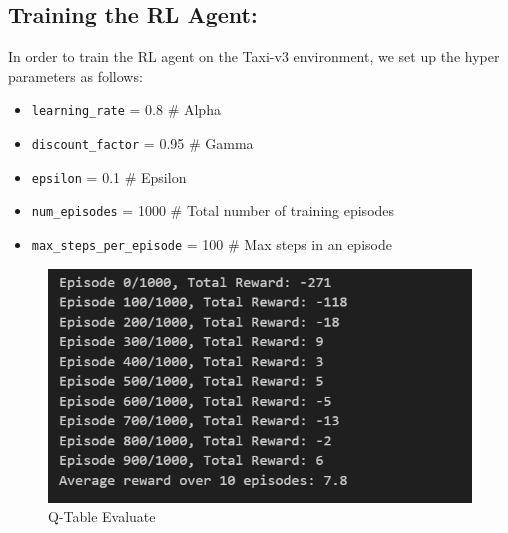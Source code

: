 \subsection{Training the RL Agent: }
In order to train the RL agent on the Taxi-v3 environment, we set up the hyper parameters as follows:
\begin{itemize}
    \item \texttt{learning\_rate} = 0.8 \quad \# Alpha
    \item \texttt{discount\_factor} = 0.95 \quad \# Gamma
    \item \texttt{epsilon} = 0.1 \quad \# Epsilon
    \item \texttt{num\_episodes} = 1000 \quad \# Total number of training episodes
    \item \texttt{max\_steps\_per\_episode} = 100 \quad \# Max steps in an episode
\end{itemize}


\begin{figure}[H]  %
    \centering
    \includegraphics[width=1\linewidth]{figures/Q-Table_Evaluate.PNG}
    \caption{Q-Table Evaluate}
    \label{fig:Q-Table Evaluate}
\end{figure}

